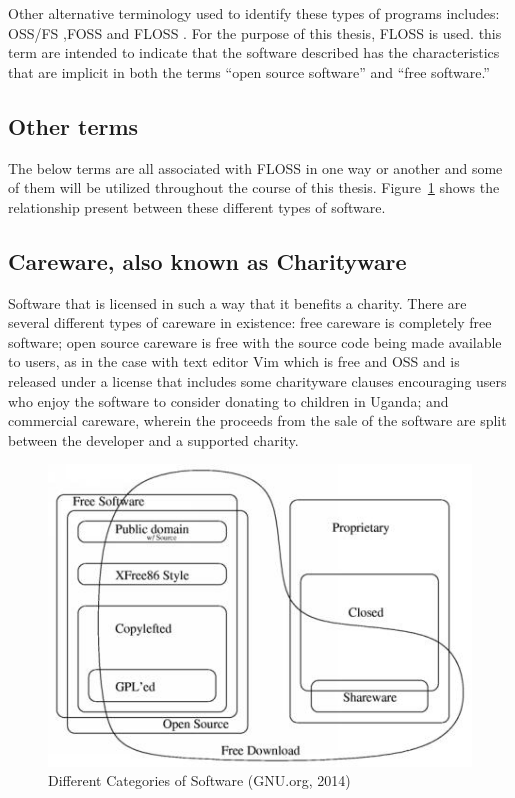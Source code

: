  Other alternative terminology used to identify these types of programs includes:   \ac{OSS/FS} ,\ac{FOSS} and  \ac{FLOSS} . For the purpose of this thesis, \ac{FLOSS} is used. this term are intended to indicate that the software described has the characteristics that are implicit in both the terms “open source software” and “free software.”
 
  \subsection{Other terms}
  The below terms are all associated with FLOSS in one way or another and some of them will be utilized throughout the course of this thesis. Figure~\ref{fig:categoriesofsoftware} shows the relationship present between these different types of software.
 \subsection*{Careware, also known as Charityware} 
Software that is licensed in such a way that it benefits a charity. There are several different types of careware in existence: free careware is completely free software; open source careware is free with the source code being made available to users, as in the case with text editor Vim which is free and OSS and is released under a license that includes some charityware clauses encouraging users who enjoy the software to consider donating to children in Uganda; and commercial careware, wherein the proceeds from the sale of the software are split between the developer and a supported charity. 
    \begin{figure}[H]
        \includegraphics[scale=0.97]{img/free-open.jpg}
      \caption{Different Categories of Software (GNU.org, 2014)}
      \label{fig:categoriesofsoftware}
    \end{figure}
